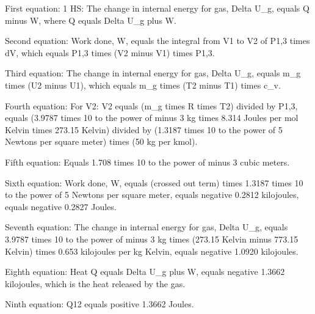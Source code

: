 First equation:
1 HS: The change in internal energy for gas, Delta U_g, equals Q minus W, where Q equals Delta U_g plus W.

Second equation:
Work done, W, equals the integral from V1 to V2 of P1,3 times dV, which equals P1,3 times (V2 minus V1) times P1,3.

Third equation:
The change in internal energy for gas, Delta U_g, equals m_g times (U2 minus U1), which equals m_g times (T2 minus T1) times c_v.

Fourth equation:
For V2: V2 equals (m_g times R times T2) divided by P1,3, equals (3.9787 times 10 to the power of minus 3 kg times 8.314 Joules per mol Kelvin times 273.15 Kelvin) divided by (1.3187 times 10 to the power of 5 Newtons per square meter) times (50 kg per kmol).

Fifth equation:
Equals 1.708 times 10 to the power of minus 3 cubic meters.

Sixth equation:
Work done, W, equals (crossed out term) times 1.3187 times 10 to the power of 5 Newtons per square meter, equals negative 0.2812 kilojoules, equals negative 0.2827 Joules.

Seventh equation:
The change in internal energy for gas, Delta U_g, equals 3.9787 times 10 to the power of minus 3 kg times (273.15 Kelvin minus 773.15 Kelvin) times 0.653 kilojoules per kg Kelvin, equals negative 1.0920 kilojoules.

Eighth equation:
Heat Q equals Delta U_g plus W, equals negative 1.3662 kilojoules, which is the heat released by the gas.

Ninth equation:
Q12 equals positive 1.3662 Joules.